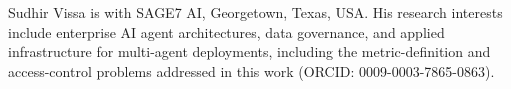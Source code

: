 \documentclass[nolineno]{ieeeaccess}
\begin{document}
\begin{IEEEbiographynophoto}{Sudhir Vissa}
is with SAGE7 AI, Georgetown, Texas, USA. His research interests include
enterprise AI agent architectures, data governance, and applied
infrastructure for multi-agent deployments, including the
metric-definition and access-control problems addressed in this work
(ORCID: 0009-0003-7865-0863).
\end{IEEEbiographynophoto}
\EOD
\end{document}
